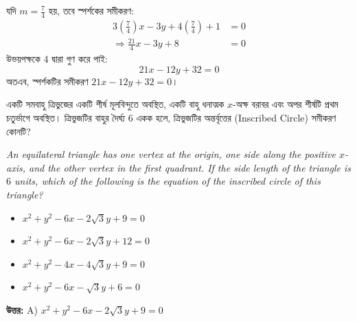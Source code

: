 \documentclass[12pt, a4paper]{article}
\begin{document}
\begin{tcolorbox}[solutionbox={সমাধান (Solution)}]
    যদি $m = \frac{7}{4}$ হয়, তবে স্পর্শকের সমীকরণ:
    \begin{align*}
        3\left(\frac{7}{4}\right)x - 3y + 4\left(\frac{7}{4}\right) + 1 &= 0 \\
        \Rightarrow \frac{21}{4}x - 3y + 8 &= 0
    \end{align*}
    উভয়পক্ষকে $4$ দ্বারা গুণ করে পাই:
    \[ 21x - 12y + 32 = 0 \]
    অতএব, স্পর্শকটির সমীকরণ \textbf{$21x - 12y + 32 = 0$}।
\end{tcolorbox}

\vspace{2em}

\begin{tcolorbox}[questionbox={প্রশ্ন (Question) 24}]
    \noindent
    একটি সমবাহু ত্রিভুজের একটি শীর্ষ মূলবিন্দুতে অবস্থিত, একটি বাহু ধনাত্মক $x$-অক্ষ বরাবর এবং অপর শীর্ষটি প্রথম চতুর্ভাগে অবস্থিত। ত্রিভুজটির বাহুর দৈর্ঘ্য $6$ একক হলে, ত্রিভুজটির অন্তর্বৃত্তের (Inscribed Circle) সমীকরণ কোনটি?
    
    \vspace{0.8em}
    \begin{english}
    \noindent\textit{\color{darkgray}
    An equilateral triangle has one vertex at the origin, one side along the positive $x$-axis, and the other vertex in the first quadrant. If the side length of the triangle is $6$ units, which of the following is the equation of the inscribed circle of this triangle?
    }
    \end{english}
\end{tcolorbox}

\vspace{1em}
\begin{itemize}[label={}, leftmargin=1cm, itemsep=0.5em]
    \item[\textbf{A)}] $x^2 + y^2 - 6x - 2\sqrt{3}y + 9 = 0$
    \item[\textbf{B)}] $x^2 + y^2 - 6x - 2\sqrt{3}y + 12 = 0$
    \item[\textbf{C)}] $x^2 + y^2 - 4x - 4\sqrt{3}y + 9 = 0$
    \item[\textbf{D)}] $x^2 + y^2 - 6x - \sqrt{3}y + 6 = 0$
\end{itemize}

\vspace{0.5em}
\begin{tcolorbox}[answerbox]
    \textbf{\color{success} উত্তর:} A) $x^2 + y^2 - 6x - 2\sqrt{3}y + 9 = 0$
\end{tcolorbox}
\vspace{1em}
\end{document}
